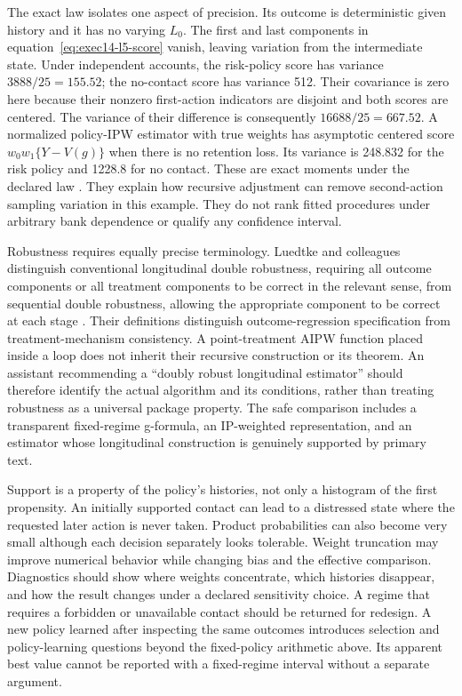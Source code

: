 The exact law isolates one aspect of precision. Its outcome is deterministic
given history and it has no varying $L_0$. The first and last components in
equation~\eqref{eq:exec14-l5-score} vanish, leaving variation from the intermediate
state. Under independent accounts, the risk-policy score has variance
$3888/25=155.52$; the no-contact score has variance 512. Their covariance is
zero here because their nonzero first-action indicators are disjoint and both
scores are centered. The variance of their difference is consequently
$16688/25=667.52$. A normalized policy-IPW estimator with true weights has
asymptotic centered score $w_0w_1\{Y-V(g)\}$ when there is no retention loss.
Its variance is 248.832 for the risk policy and 1228.8 for no contact.
These are exact moments under the declared law
\citep{exec14_workflow_oracle}. They explain how recursive adjustment can remove
second-action sampling variation in this example. They do not rank fitted
procedures under arbitrary bank dependence or qualify any confidence interval.

Robustness requires equally precise terminology. Luedtke and colleagues
distinguish conventional longitudinal double robustness, requiring all outcome
components or all treatment components to be correct in the relevant sense,
from sequential double robustness, allowing the appropriate component to be
correct at each stage \citep{sequentialdr2018}. Their definitions distinguish
outcome-regression specification from treatment-mechanism consistency. A
point-treatment AIPW function placed inside a loop does not inherit their
recursive construction or its theorem. An assistant recommending a
``doubly robust longitudinal estimator'' should therefore identify the actual
algorithm and its conditions, rather than treating robustness as a universal
package property. The safe comparison includes a transparent fixed-regime
g-formula, an IP-weighted representation, and an estimator whose longitudinal
construction is genuinely supported by primary text.

Support is a property of the policy's histories, not only a histogram of the
first propensity. An initially supported contact can lead to a distressed
state where the requested later action is never taken. Product probabilities
can also become very small although each decision separately looks tolerable.
Weight truncation may improve numerical behavior while changing bias and the
effective comparison. Diagnostics should show where weights concentrate,
which histories disappear, and how the result changes under a declared
sensitivity choice. A regime that requires a forbidden or unavailable contact
should be returned for redesign. A new policy learned after inspecting the
same outcomes introduces selection and policy-learning questions beyond the
fixed-policy arithmetic above. Its apparent best value cannot be reported
with a fixed-regime interval without a separate argument.

